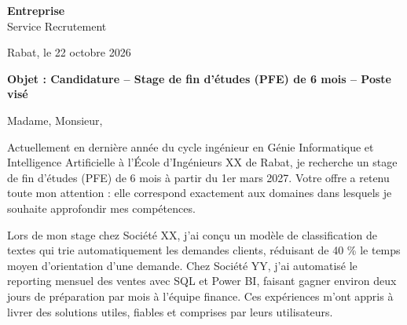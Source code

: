 \documentclass[11pt,a4paper]{article}
\begin{document}
\pagestyle{empty}

\noindent
{}

\vspace{0.8cm}

\noindent
\textbf{Entreprise}\\
\textcolor{textgray}{Service Recrutement}

\vspace{0.4cm}

\hfill \textcolor{textgray}{Rabat, le 22 octobre 2026}

\vspace{0.4cm}

\noindent
\textbf{Objet : Candidature -- Stage de fin d'études (PFE) de 6 mois -- Poste visé}

\vspace{0.4cm}

\noindent
\textcolor{textgray}{Madame, Monsieur,}

\vspace{0.3cm}

\noindent
\textcolor{textgray}{Actuellement en dernière année du cycle ingénieur en Génie Informatique et Intelligence Artificielle à l'École d'Ingénieurs XX de Rabat, je recherche un stage de fin d'études (PFE) de 6 mois à partir du 1er mars 2027. Votre offre a retenu toute mon attention : elle correspond exactement aux domaines dans lesquels je souhaite approfondir mes compétences.}

\vspace{0.4cm}

\noindent
\textcolor{textgray}{Lors de mon stage chez Société XX, j'ai conçu un modèle de classification de textes qui trie automatiquement les demandes clients, réduisant de 40 \% le temps moyen d'orientation d'une demande. Chez Société YY, j'ai automatisé le reporting mensuel des ventes avec SQL et Power BI, faisant gagner environ deux jours de préparation par mois à l'équipe finance. Ces expériences m'ont appris à livrer des solutions utiles, fiables et comprises par leurs utilisateurs.}

\vspace{0.4cm}
\end{document}
